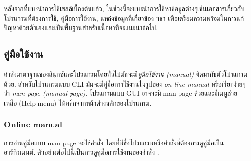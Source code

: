 \begin{thwbr}
หลังจากที่แนะนำการใช้เชลล์เบื้องต้นแล้ว, ในช่วงนี้จะแนะนำการใช้หาข้อมูลต่างๆเช่นเอกสารเกี่ยวกับโปรแกรมที่ต้องการใช้, คู่มือการใช้งาน, แหล่งข้อมูลที่เกี่ยวข้อง ฯลฯ เพื่อเตรียมความพร้อมในการแก้ปัญหาด้วยตัวเองและเป็นพื้นฐานสำหรับเนื้อหาที่จะแนะนำต่อไป. 



\subsection{คู่มือใช้งาน}
คำสั่งมาตรฐานของลินุกซ์และโปรแกรมโดยทั่วไปมักจะมี\emph{คู่มือใช้งาน (manual)} ติดมากับตัวโปรแกรมด้วย. สำหรับโปรแกรมแบบ CLI มันจะมีคู่มือการใช้งานในรูปของ \emph{on-line manual} หรือเรียกง่ายๆว่า \emph{man page (manual page)}. โปรแกรมแบบ GUI อาจจะมี man page ด้วยและมีเมนูช่วยเหลือ (Help menu) ให้คลิ้กจากหน้าต่างหลักของโปรแกรม. 

\subsubsection{Online manual}
การอ่านคู่มือแบบ man page จะใช้คำสั่ง   โดยที่มีชื่อโปรแกรมหรือคำสั่งที่ต้องการดูคู่มือเป็นอาร์กิวเมนต์. ตัวอย่างต่อไปนี้เป็นการดูคู่มือการใช้งานของคำสั่ง .

\begin{MyExample}\label{ex:man}
\end{MyExample}
\end{thwbr}
